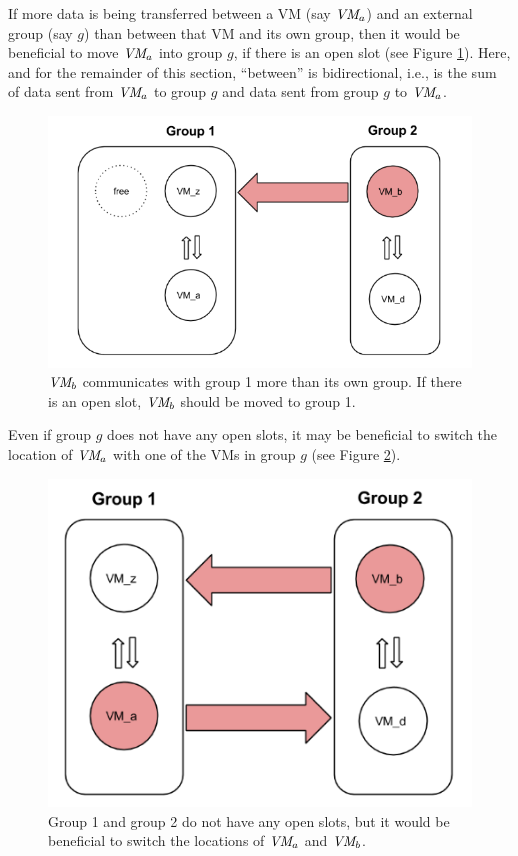 \documentclass[11pt]{article}
\begin{document}
If more data is being transferred between a VM (say $\textit{VM}_a$) and an external group (say $g$) than between that VM and its own group, then it would be beneficial to move $\textit{VM}_a$ into group $g$, if there is an open slot (see Figure \ref{fig:micro-move}).  Here, and for the remainder of this section, ``between'' is bidirectional, i.e., is the sum of data sent from $\textit{VM}_a$ to group $g$ and data sent from group $g$ to $\textit{VM}_a$.

\begin{figure}
  \centering
\includegraphics[scale=0.65]{micro1.png}

 \caption{$\textit{VM}_b$ communicates with group 1 more than its own group.  If there is an open slot, $\textit{VM}_b$ should be moved to group 1.}

 \label{fig:micro-move}
 
\end{figure}

Even if group $g$ does not have any open slots, it may be beneficial to switch the location of $\textit{VM}_a$ with one of the VMs in group $g$ (see Figure \ref{fig:micro-switch}).
\begin{figure}
  \centering
\includegraphics[scale=0.65]{micro2.png}

 \caption{Group 1 and group 2 do not have any open slots, but it would be beneficial to switch the locations of $\textit{VM}_a$ and $\textit{VM}_b$.}

 \label{fig:micro-switch}
 
\end{figure}
\end{document}
